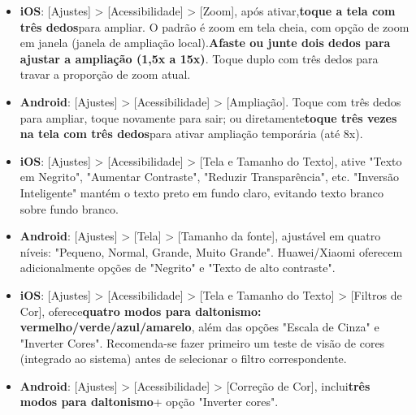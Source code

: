 

\begin{itemize}
  \item \textbf{iOS}: [Ajustes] > [Acessibilidade] > [Zoom], após ativar,\textbf{toque a tela com três dedos}para ampliar. O padrão é zoom em tela cheia, com opção de zoom em janela (janela de ampliação local).\textbf{Afaste ou junte dois dedos para ajustar a ampliação (1,5x a 15x)}. Toque duplo com três dedos para travar a proporção de zoom atual.
  \item \textbf{Android}: [Ajustes] > [Acessibilidade] > [Ampliação]. Toque com três dedos para ampliar, toque novamente para sair; ou diretamente\textbf{toque três vezes na tela com três dedos}para ativar ampliação temporária (até 8x).
\end{itemize}


\begin{itemize}
  \item \textbf{iOS}: [Ajustes] > [Acessibilidade] > [Tela e Tamanho do Texto], ative "Texto em Negrito", "Aumentar Contraste", "Reduzir Transparência", etc. "Inversão Inteligente" mantém o texto preto em fundo claro, evitando texto branco sobre fundo branco.
  \item \textbf{Android}: [Ajustes] > [Tela] > [Tamanho da fonte], ajustável em quatro níveis: "Pequeno, Normal, Grande, Muito Grande". Huawei/Xiaomi oferecem adicionalmente opções de "Negrito" e "Texto de alto contraste".
\end{itemize}


\begin{itemize}
  \item \textbf{iOS}: [Ajustes] > [Acessibilidade] > [Tela e Tamanho do Texto] > [Filtros de Cor], oferece\textbf{quatro modos para daltonismo: vermelho/verde/azul/amarelo}, além das opções "Escala de Cinza" e "Inverter Cores". Recomenda-se fazer primeiro um teste de visão de cores (integrado ao sistema) antes de selecionar o filtro correspondente.
  \item \textbf{Android}: [Ajustes] > [Acessibilidade] > [Correção de Cor], inclui\textbf{três modos para daltonismo}+ opção "Inverter cores".
\end{itemize}

